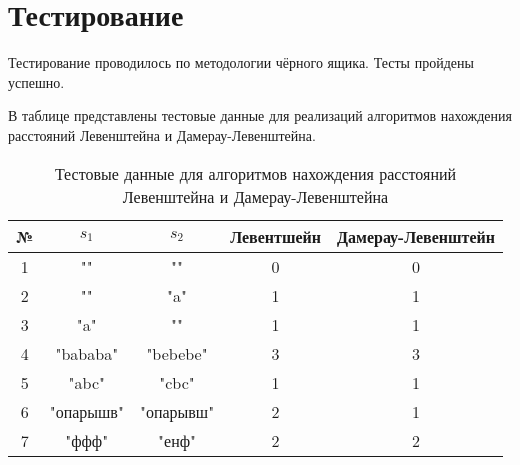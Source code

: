 \section{Тестирование}
Тестирование проводилось по методологии чёрного ящика. Тесты пройдены успешно.

В таблице  представлены тестовые данные для реализаций алгоритмов нахождения расстояний Левенштейна и Дамерау-Левенштейна. 

\begin{table}[H]
  \caption{\label{table:tests} Тестовые данные для алгоритмов нахождения расстояний Левенштейна и Дамерау-Левенштейна}
  \begin{center}
    \begin{tabular}{|c|c|c|c|c|}
      \hline
      № & $s_1$ & $s_2$ & Левентшейн & Дамерау-Левенштейн \\ \hline
      1 & "{}" & "{}" & 0 & 0 \\ \hline
      2 & "{}" & "a" & 1 & 1 \\ \hline
      3 & "a" & "{}" & 1 & 1 \\ \hline
      4 & "bababa" & "bebebe" & 3 & 3 \\ \hline
      5 & "abc" & "cbc" & 1 & 1 \\ \hline
      6 & "опарышв" & "опарывш" & 2 & 1 \\ \hline
      7 & "ффф" & "енф" & 2 & 2 \\ \hline
    \end{tabular}
  \end{center}
\end{table}

\newpage